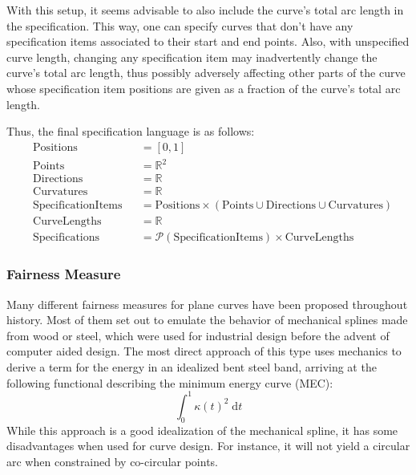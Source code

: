 \documentclass[a4paper]{article}
\newcommand{\apply}[2]{#1\!\left(#2\right)}
\begin{document}
				With this setup, it seems advisable to also include the curve's total arc length in the specification. This way, one can specify curves that don't have any specification items associated to their start and end points. Also, with unspecified curve length, changing any specification item may inadvertently change the curve's total arc length, thus possibly adversely affecting other parts of the curve whose specification item positions are given as a fraction of the curve's total arc length.

				Thus, the final specification language is as follows:
				\begin{equation*}
					\begin{alignedat}{2}
						& \mathrm{Positions}          && = \left[0, 1\right]\\
						& \mathrm{Points}             && = \mathbb{R}^2\\
						& \mathrm{Directions}         && = \mathbb{R}\\
						& \mathrm{Curvatures}         && = \mathbb{R}\\
						& \mathrm{SpecificationItems} && = \mathrm{Positions} \times \left(\mathrm{Points} \cup \mathrm{Directions} \cup \mathrm{Curvatures}\right)\\
						& \mathrm{CurveLengths}       && = \mathbb{R}\\
						& \mathrm{Specifications}     && = \mathcal{P}\left(\mathrm{SpecificationItems}\right) \times \mathrm{CurveLengths}
					\end{alignedat}
				\end{equation*}

			\subsubsection{Fairness Measure}
			\label{section:fairness_measure}


				Many different fairness measures for plane curves have been proposed throughout history. Most of them set out to emulate the behavior of mechanical splines made from wood or steel, which were used for industrial design before the advent of computer aided design. The most direct approach of this type uses mechanics to derive a term for the energy in an idealized bent steel band, arriving at the following functional describing the minimum energy curve (MEC):
				\begin{equation*}
					\int_{0}^{1}\apply{\kappa}{t}^2\;\mathrm{d}t
				\end{equation*}
				While this approach is a good idealization of the mechanical spline, it has some disadvantages when used for curve design. For instance, it will not yield a circular arc when constrained by co-circular points.
\end{document}
